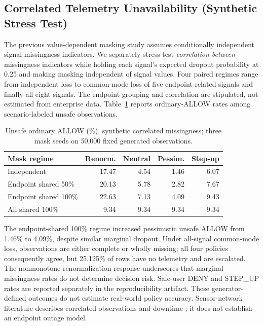 \subsection{Correlated Telemetry Unavailability (Synthetic Stress Test)}
The previous value-dependent masking study assumes conditionally independent
signal-missingness indicators. We separately stress-test \emph{correlation
between} missingness indicators while holding each signal's expected dropout
probability at 0.25 and making masking independent of signal values. Four
paired regimes range from independent loss to common-mode loss of five
endpoint-related signals and finally all eight signals. The endpoint grouping
and correlation are stipulated, not estimated from enterprise data. Table~\ref{tab:correlated-outage}
reports ordinary-ALLOW rates among scenario-labeled unsafe observations.
\begin{table}[t]
\centering
\caption{Unsafe ordinary ALLOW (\%), synthetic correlated missingness;
three mask seeds on 50,000 fixed generated observations.}
\label{tab:correlated-outage}
\begin{tabular}{lrrrr}
\toprule
Mask regime & Renorm. & Neutral & Pessim. & Step-up \\
\midrule
Independent & 17.47 & 4.54 & 1.46 & 6.07 \\
Endpoint shared 50\% & 20.13 & 5.78 & 2.82 & 7.67 \\
Endpoint shared 100\% & 22.63 & 7.13 & 4.09 & 9.43 \\
All shared 100\% & 9.34 & 9.34 & 9.34 & 9.34 \\
\bottomrule
\end{tabular}
\end{table}
The endpoint-shared 100\% regime increased pessimistic unsafe ALLOW from
1.46\% to 4.09\%, despite similar marginal dropout. Under all-signal
common-mode loss, observations are either complete or wholly missing; all
four policies consequently agree, but 25.125\% of rows have no telemetry
and are escalated. The nonmonotone renormalization response underscores that
marginal missingness rates do not determine decision risk. Safe-user DENY
and STEP\_UP rates are reported separately in the reproducibility artifact.
These generator-defined outcomes do not estimate real-world policy accuracy.
Sensor-network literature describes correlated observations and downtime
\cite{dinwoodie2019sensor}; it does not establish an endpoint outage model.
